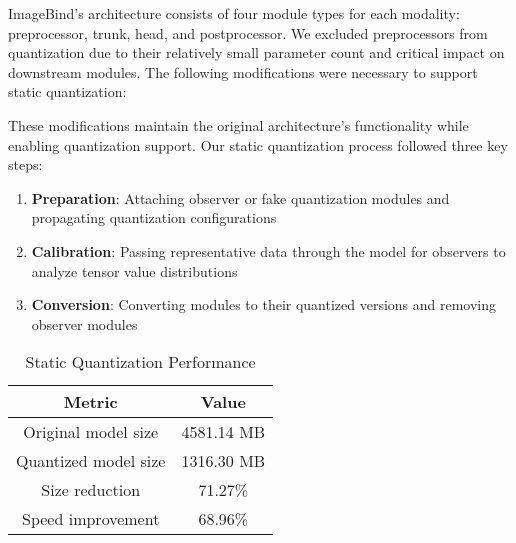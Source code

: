 \documentclass[runningheads]{IEEEtran}
\begin{document}
ImageBind's architecture consists of four module types for each modality: preprocessor, trunk, head, and postprocessor. We excluded preprocessors from quantization due to their relatively small parameter count and critical impact on downstream modules. The following modifications were necessary to support static quantization:


These modifications maintain the original architecture's functionality while enabling quantization support. Our static quantization process followed three key steps:

\begin{enumerate}
    \item \textbf{Preparation}: Attaching observer or fake quantization modules and propagating quantization configurations
    \item \textbf{Calibration}: Passing representative data through the model for observers to analyze tensor value distributions
    \item \textbf{Conversion}: Converting modules to their quantized versions and removing observer modules
\end{enumerate}



\begin{table}[ht]
\caption{Static Quantization Performance}
\label{tab:static_quant}
\centering
\begin{tabular}{|c|c|}
\hline
\textbf{Metric} & \textbf{Value} \\
\hline
Original model size & 4581.14 MB \\
Quantized model size & 1316.30 MB \\
Size reduction & 71.27\% \\
Speed improvement & 68.96\% \\
\hline
\end{tabular}
\end{table}
\end{document}
